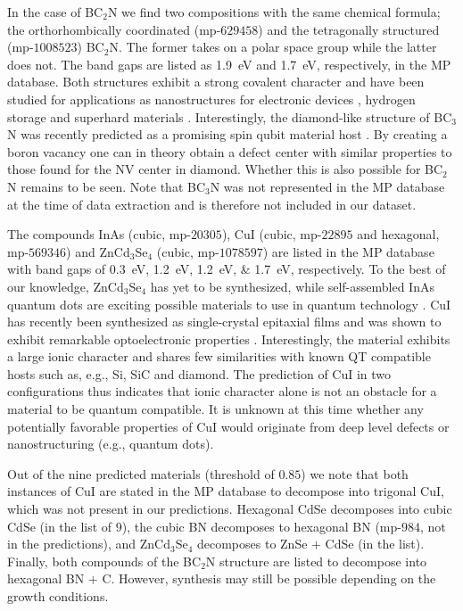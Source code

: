 \documentclass[superscriptaddress,
preprint,
 amsmath,amssymb,
 aps,
]{revtex4-2}
\newcommand{\mrk}[1]{\textcolor{red}{#1}}
\begin{document}
In the case of BC$_2$N we find two compositions with the same chemical formula; the orthorhombically coordinated (mp-$629458$) and the tetragonally structured (mp-$1008523$) BC$_2$N. The former takes on a polar space group while the latter does not. The band gaps are listed as \SI{1.9}{\electronvolt} and \SI{1.7}{\electronvolt}, respectively, in the MP database. Both structures exhibit a strong covalent character and have been studied for applications as nanostructures for electronic devices \cite{Gao2017}, hydrogen storage \cite{Cai2017} and superhard materials \cite{Li2017, Jiang2020}. Interestingly, the diamond-like structure of BC$_3$N was recently predicted as a promising  spin qubit material host \cite{Wang2020SpinQB}. By creating a boron vacancy one can in theory obtain a defect center with similar properties to those found for the NV center in diamond. Whether this is also possible for BC$_2$N remains to be seen. Note that BC$_3$N was not represented in the MP database at the time of data extraction and is therefore not included in our dataset. 

The compounds InAs (cubic, mp-$20305$), CuI (cubic, mp-$22895$ and hexagonal, mp-$569346$) and ZnCd$_3$Se$_4$ (cubic, mp-$1078597$) are listed in the MP database with band gaps of \SIlist{0.3;1.2;1.2;1.7}{\electronvolt}, respectively. 
To the best of our knowledge, ZnCd$_3$Se$_4$ has yet to be synthesized, while self-assembled InAs quantum dots are  exciting possible materials to use in quantum technology \cite{Liu2018}. 
CuI has recently been synthesized as single-crystal epitaxial films and was shown to exhibit remarkable optoelectronic properties \cite{Ahn2020}. Interestingly, the material exhibits a large ionic character 
and shares few similarities with known QT compatible hosts such as, e.g., Si, SiC and  diamond. The prediction of CuI in two configurations thus indicates that ionic character alone is not an obstacle for a material to be quantum compatible. It is unknown at this time whether any potentially favorable properties of CuI would originate from deep level defects or  nanostructuring (e.g., quantum dots). %

Out of the nine predicted materials (threshold of $0.85$) we note that both instances of CuI are stated in the MP database to decompose into trigonal CuI, which was not present in our predictions. Hexagonal CdSe decomposes into cubic CdSe (in the list of $9$), the cubic BN decomposes to hexagonal BN (mp-$984$, not in the predictions), and ZnCd$_3$Se$_4$ decomposes to ZnSe $+$ CdSe (in the list). Finally, both compounds of the BC$_2$N structure are listed to decompose into hexagonal BN $+$ C. 
However, synthesis may still be possible depending on the growth conditions. 
\end{document}

